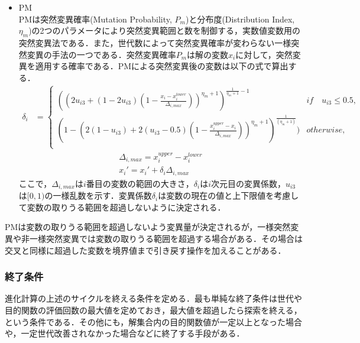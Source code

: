 \begin{itemize}
    \item PM\cite{Deb96}\\
          PMは突然変異確率(Mutation Probability, $P_m$)と分布度(Distribution Index, $\eta_m$)の2つのパラメータにより突然変異範囲と数を制御する，実数値変数用の突然変異法である．また，世代数によって突然変異確率が変わらない一様突然変異の手法の一つである．突然変異確率$P_m$は解の変数$x_i$に対して，突然変異を適用する確率である．PMによる突然変異後の変数は以下の式で算出する．
          \begin{align}
              \delta_i & =
              \begin{cases}
                  ((2u_{i3}+(1-2u_{i3})(1-\frac{x_i-x_i^{lower}}{\Delta_{i,max}}))^{\eta_m+1})^{\frac{1}{\eta_m+1}-1}          & if \quad u_{i3} \leq 0.5, \\
                  (1-(2(1-u_{i3})+2(u_{i3}-0.5)(1-\frac{x_i^{upper}-x_i}{\Delta_{i,max}}))^{\eta_m+1})^{\frac{1}{(\eta_m+1)}}) & otherwise,                \\
              \end{cases}
              \label{eq::theory_mutation_pm}
          \end{align}
          \begin{align}
              \Delta_{i,max} = x_i^{upper}-x_i^{lower} \\
              x_{i}' = x_{i}' + \delta_i \Delta_{i,max}
          \end{align}
          ここで，$\Delta_{i,max}$は$i$番目の変数の範囲の大きさ，$\delta_i$は$i$次元目の変異係数，$u_{i3}$は$[0,1)$の一様乱数を示す．変異係数$\delta_i$は変数の現在の値と上下限値を考慮して変数の取りうる範囲を超過しないように決定される．

\end{itemize}

PMは変数の取りうる範囲を超過しないよう変異量が決定されるが，一様突然変異や非一様突然変異では変数の取りうる範囲を超過する場合がある．その場合は交叉と同様に超過した変数を境界値まで引き戻す操作を加えることがある．

\subsubsection{終了条件}
進化計算の上述のサイクルを終える条件を定める．最も単純な終了条件は世代や目的関数の評価回数の最大値を定めておき，最大値を超過したら探索を終える，という条件である．その他にも，解集合内の目的関数値が一定以上となった場合や，一定世代改善されなかった場合などに終了する手段がある．

